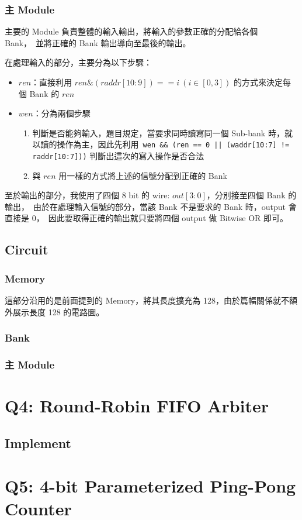 \documentclass[10.5pt,compsoc,UTF8]{CjC}
\theoremstyle{mystyle}
\begin{document}


\subsubsection*{主 Module}
主要的 Module 負責整體的輸入輸出，將輸入的參數正確的分配給各個 Bank，\
並將正確的 Bank 輸出導向至最後的輸出。

在處理輸入的部分，主要分為以下步驟：
\begin{itemize}
  \item $ren$：直接利用 $ren \& (raddr[10:9]) == i\ (i \in [0, 3])$ 的方式來決定每個 Bank 的 $ren$
  \item $wen$：分為兩個步驟
  \begin{enumerate}
    \item 判斷是否能夠輸入，題目規定，當要求同時讀寫同一個 Sub-bank 時，就以讀的操作為主，因此先利用\
    \texttt{wen \&\& (ren == 0 || (waddr[10:7] != raddr[10:7]))} 判斷出這次的寫入操作是否合法
    \item 與 $ren$ 用一樣的方式將上述的信號分配到正確的 Bank
  \end{enumerate}
\end{itemize}

至於輸出的部分，我使用了四個 8 bit 的 wire: $out[3:0]$，分別接至四個 Bank 的輸出，\
由於在處理輸入信號的部分，當該 Bank 不是要求的 Bank 時，output 會直接是 $0$，\
因此要取得正確的輸出就只要將四個 output 做 Bitwise OR 即可。


\subsection{Circuit}

\subsubsection*{Memory}
這部分沿用的是前面提到的 Memory，將其長度擴充為 128，由於篇幅關係就不額外展示長度 128 的電路圖。

\subsubsection*{Bank}


\subsubsection*{主 Module}


\section{Q4: Round-Robin FIFO Arbiter}

\subsection{Implement}

\section{Q5: 4-bit Parameterized Ping-Pong Counter}
\end{document}
